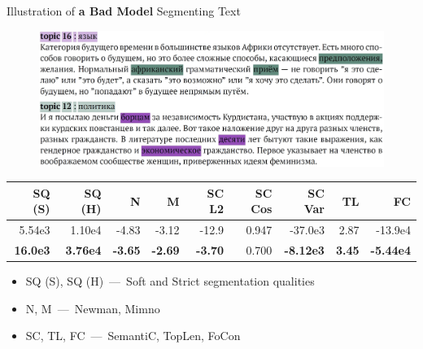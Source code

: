 \documentclass[russian]{beamer}
\begin{document}
\begin{frame}{Illustration of \textbf{a Bad Model} Segmenting Text}
  \begin{figure}[h]
    \centering
    \includegraphics[width=\textwidth]{combine_bad.jpg}
  \end{figure}
  
  \vspace{-0.5cm}

  \begin{table}[h]
    \scriptsize
    \centering
    \begin{tabular}{rrrrrrrrr}
      SQ (S) & SQ (H) & N & M & SC L2 & SC Cos & SC Var & TL & FC\\
      \midrule
      \rowcolor{my-blue-light}
      5.54e3 & 1.10e4 & -4.83 & -3.12 & -12.9 & 0.947 & -37.0e3 & 2.87 & -13.9e4\\
      \textbf{16.0e3} & \textbf{3.76e4} & \textbf{-3.65} & \textbf{-2.69} & \textbf{-3.70} & 0.700 & \textbf{-8.12e3} & \textbf{3.45} & \textbf{-5.44e4}
    \end{tabular}
  \end{table}
  
  \begin{itemize}\setlength{\itemindent}{0pt}
    \small
    \item SQ (S), SQ (H)~---~Soft and Strict segmentation qualities
    \item N, M~---~Newman, Mimno
    \item SC, TL, FC~---~SemantiC, TopLen, FoCon
  \end{itemize}
\end{frame}
\end{document}
